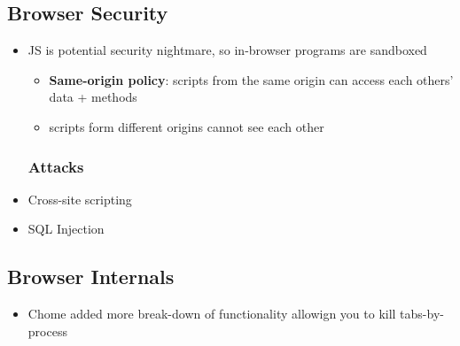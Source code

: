 \subsection{Browser Security}
\begin{itemize}
	\item JS is potential security nightmare, so in-browser programs are sandboxed
	\begin{itemize}
		\item \textbf{Same-origin policy}: scripts from the same origin can access each others' data + methods
		\item scripts form different origins cannot see each other
	\end{itemize}
	\subsubsection{Attacks}
	\item Cross-site scripting
	\item SQL Injection
\end{itemize}

\subsection{Browser Internals}
\begin{itemize}
	\item Chome added more break-down of functionality allowign you to kill tabs-by-process
\end{itemize}
